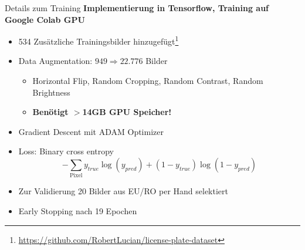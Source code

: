 \begin{frame}{Details zum Training}
    \textbf{Implementierung in Tensorflow, Training auf Google Colab GPU}
    \begin{itemize}
        \item 534 Zus\"atzliche Trainingsbilder hinzugef\"ugt\footnote{\url{https://github.com/RobertLucian/license-plate-dataset}}
        \item Data Augmentation: $949 \Rightarrow 22.776$ Bilder
              \begin{itemize}
                  \item Horizontal Flip, Random Cropping, Random Contrast, Random Brightness
                  \item \textbf{Ben\"otigt $>$14GB GPU Speicher!}
              \end{itemize}
        \item Gradient Descent mit ADAM Optimizer
        \item Loss: Binary cross entropy
              \begin{equation*}
                  -\sum_{\text{Pixel}} y_{true} \log (y_{pred}) + (1 - y_{true}) \log (1 - y_{pred})
              \end{equation*}
        \item Zur Validierung 20 Bilder aus EU/RO per Hand selektiert
        \item \glqq Early Stopping\grqq{} nach 19 Epochen
    \end{itemize}
\end{frame}
